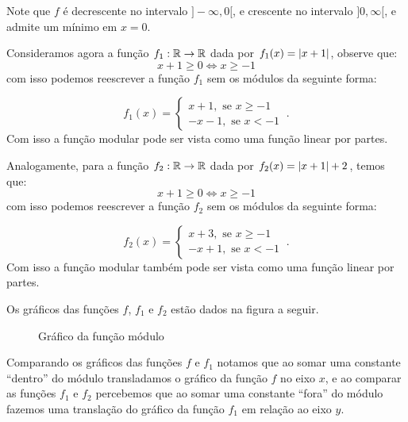   Note que $f$ é decrescente no intervalo $]-\infty, 0[$, e crescente no intervalo $]0, \infty[$, e admite um mínimo em $x=0$.

  Consideramos agora a função $f_1: \mathbb{R} \rightarrow \mathbb{R}$ dada por $f_1(x)= \left|x+1\right|$, observe que:
  \[x+1 \geq 0 \Leftrightarrow  x \geq -1\]
  com isso podemos reescrever a função $f_1$ sem os módulos da seguinte forma:

  \[f_1(x)= \begin{cases}
                 x + 1, \text{ se } x \geq -1 \\
                 -x - 1, \text{ se } x < -1
                \end{cases} \ .\]
  Com isso a função modular pode ser vista como uma função linear por partes.

  Analogamente, para a função $f_2: \mathbb{R} \rightarrow \mathbb{R}$ dada por $f_2(x)= \left|x+1\right|+2$, temos que:
  \[x+1 \geq 0 \Leftrightarrow  x \geq -1\]
  com isso podemos reescrever a função $f_2$ sem os módulos da seguinte forma:

  \[f_2(x)= \begin{cases}
                 x + 3, \text{ se } x \geq -1 \\
                 -x + 1, \text{ se } x < -1
                \end{cases} \ .\]
  Com isso a função modular também pode ser vista como uma função linear por partes.

  Os gráficos das funções $f$, $f_1$ e $f_2$ estão dados na figura a seguir.

  \begin{figure}[H]
 \centering
    \caption{Gráfico da função módulo}
  \end{figure}

  Comparando os gráficos das funções $f$ e $f_1$ notamos que ao somar uma constante ``dentro'' do módulo transladamos o gráfico da função $f$ no eixo $x$, e ao comparar as funções $f_1$ e $f_2$ percebemos que ao somar uma constante ``fora'' do módulo fazemos uma translação do gráfico da função $f_1$ em relação ao eixo $y$.

